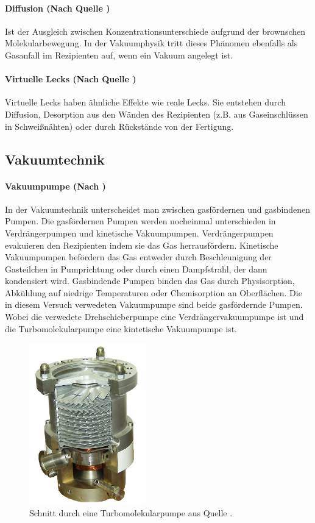 \paragraph{Diffusion (Nach Quelle \cite{wiki:dif})}
Ist der Ausgleich zwischen Konzentrationsunterschiede aufgrund der brownschen Molekularbewegung. 
In der Vakuumphysik tritt dieses Phänomen ebenfalls als Gasanfall im Rezipienten auf, wenn 
ein Vakuum angelegt ist.
\paragraph{Virtuelle Lecks (Nach Quelle \cite{wiki:vl})}
Virtuelle Lecks haben ähnliche Effekte wie reale Lecks. Sie entstehen durch Diffusion, Desorption 
aus den Wänden des Rezipienten (z.B. aus Gaseinschlüssen in Schweißnähten) oder durch Rückstände 
von der Fertigung.

\subsection{Vakuumtechnik}
\paragraph{Vakuumpumpe (Nach \cite{pfeiffer})}
In der Vakuumtechnik unterscheidet man zwischen gasfördernen und gasbindenen Pumpen. Die 
gasfördernen Pumpen werden nocheinmal unterschieden in Verdrängerpumpen und kinetische Vakuumpumpen. 
Verdrängerpumpen evakuieren den Rezipienten indem sie das Gas herrausfördern. Kinetische 
Vakuumpumpen befördern das Gas entweder durch Beschleunigung der Gasteilchen in Pumprichtung oder 
durch einen Dampfstrahl, der dann kondensiert wird. Gasbindende Pumpen binden das Gas durch 
Physisorption, Abkühlung auf niedrige Temperaturen oder Chemisorption an Oberflächen.
Die in diesem Versuch verwedeten Vakuumpumpe sind beide gasfördernde Pumpen. Wobei 
die verwedete Drehschieberpumpe eine Verdrängervakuumpumpe ist und die Turbomolekularpumpe 
eine kintetische Vakuumpumpe ist.



\begin{figure}
  \centering
  \includegraphics[height = 7cm]{pics/tm.jpg}
  \caption{Schnitt durch eine Turbomolekularpumpe aus Quelle \cite{wiki:tm}.}
  \label{fig:stm}
\end{figure}


